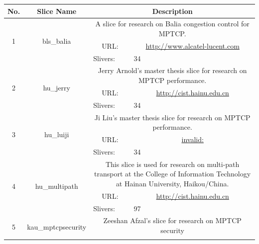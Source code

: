 \begin{small}
\begin{center}
\begin{longtable}{|c|c|c|c|}
 \hline
 No. & Slice Name & \multicolumn{2}{|p{20em}|}{Description} \\ \hline
 \multirow{3}{*}{1} & \multirow{3}{*}{\index{bls\_balia}\index{Slice!bls\_balia}bls\_balia} & \multicolumn{2}{|p{30em}|}{A slice for research on Balia congestion control for MPTCP.} \\* \cline{3-3}\cline{4-4}
  &  & \multicolumn{1}{|p{5em}|}{URL:} & \multicolumn{1}{|p{22.5em}|}{\url{http://www.alcatel-lucent.com}} \\* \cline{3-3}\cline{4-4}
  &  & \multicolumn{1}{|l|}{Slivers:} & \multicolumn{1}{|l|}{34} \\ \hline
 \multirow{3}{*}{2} & \multirow{3}{*}{\index{hu\_jerry}\index{Slice!hu\_jerry}hu\_jerry} & \multicolumn{2}{|p{30em}|}{Jerry Arnold's master thesis slice for research on MPTCP performance.} \\* \cline{3-3}\cline{4-4}
  &  & \multicolumn{1}{|p{5em}|}{URL:} & \multicolumn{1}{|p{22.5em}|}{\url{http://cist.hainu.edu.cn}} \\* \cline{3-3}\cline{4-4}
  &  & \multicolumn{1}{|l|}{Slivers:} & \multicolumn{1}{|l|}{34} \\ \hline
 \multirow{3}{*}{3} & \multirow{3}{*}{\index{hu\_luiji}\index{Slice!hu\_luiji}hu\_luiji} & \multicolumn{2}{|p{30em}|}{Ji Liu's master thesis slice for research on MPTCP performance.} \\* \cline{3-3}\cline{4-4}
  &  & \multicolumn{1}{|p{5em}|}{URL:} & \multicolumn{1}{|p{22.5em}|}{\url{invalid:}} \\* \cline{3-3}\cline{4-4}
  &  & \multicolumn{1}{|l|}{Slivers:} & \multicolumn{1}{|l|}{34} \\ \hline
 \multirow{3}{*}{4} & \multirow{3}{*}{\index{hu\_multipath}\index{Slice!hu\_multipath}hu\_multipath} & \multicolumn{2}{|p{30em}|}{This slice is used for research on multi-path transport at the College of Information Technology at Hainan University, Haikou/China.} \\* \cline{3-3}\cline{4-4}
  &  & \multicolumn{1}{|p{5em}|}{URL:} & \multicolumn{1}{|p{22.5em}|}{\url{http://cist.hainu.edu.cn}} \\* \cline{3-3}\cline{4-4}
  &  & \multicolumn{1}{|l|}{Slivers:} & \multicolumn{1}{|l|}{97} \\ \hline
 \multirow{3}{*}{5} & \multirow{3}{*}{\index{kau\_mptcpsecurity}\index{Slice!kau\_mptcpsecurity}kau\_mptcpsecurity} & \multicolumn{2}{|p{30em}|}{Zeeshan Afzal's slice for research on MPTCP security} \\* \cline{3-3}\cline{4-4}

\end{longtable}
\end{center}
\end{small}
